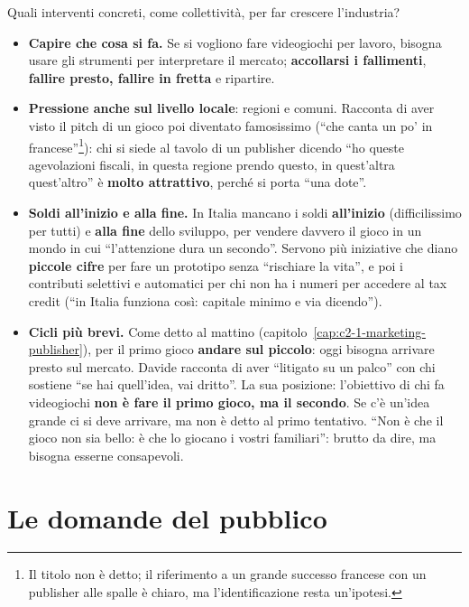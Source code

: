 Quali interventi concreti, come collettività, per far crescere l'industria?

\begin{itemize}
  \item \textbf{Capire che cosa si fa.} Se si vogliono fare videogiochi per lavoro,
        bisogna usare gli strumenti per interpretare il mercato; \textbf{accollarsi
        i fallimenti}, \textbf{fallire presto, fallire in fretta} e ripartire.
  \item \textbf{Pressione anche sul livello locale}: regioni e comuni. Racconta di
        aver visto il pitch di un gioco poi diventato famosissimo (``che canta un
        po' in francese''\footnote{Il titolo non è detto; il riferimento a un
        grande successo francese con un publisher alle spalle è chiaro, ma
        l'identificazione resta un'ipotesi.}): chi si siede al tavolo di un
        publisher dicendo ``ho queste agevolazioni fiscali, in questa regione
        prendo questo, in quest'altra quest'altro'' è \textbf{molto attrattivo},
        perché si porta ``una dote''.
  \item \textbf{Soldi all'inizio e alla fine.} In Italia mancano i soldi
        \textbf{all'inizio} (difficilissimo per tutti) e \textbf{alla fine} dello
        sviluppo, per vendere davvero il gioco in un mondo in cui ``l'attenzione
        dura un secondo''. Servono più iniziative che diano \textbf{piccole cifre}
        per fare un prototipo senza ``rischiare la vita'', e poi i contributi
        selettivi e automatici per chi non ha i numeri per accedere al tax
        credit (``in Italia funziona così: capitale minimo e via
        dicendo'').
  \item \textbf{Cicli più brevi.} Come detto al mattino
        (capitolo~\ref{cap:c2-1-marketing-publisher}), per il primo gioco
        \textbf{andare sul piccolo}: oggi bisogna arrivare presto sul mercato.
        Davide racconta di aver ``litigato su un palco'' con chi sostiene ``se hai
        quell'idea, vai dritto''. La sua posizione: l'obiettivo di chi fa
        videogiochi \textbf{non è fare il primo gioco, ma il secondo}. Se c'è
        un'idea grande ci si deve arrivare, ma non è detto al primo tentativo.
        ``Non è che il gioco non sia bello: è che lo giocano i vostri familiari'':
        brutto da dire, ma bisogna esserne consapevoli.
\end{itemize}

\section{Le domande del pubblico}
\label{sec:c2-3-domande}

